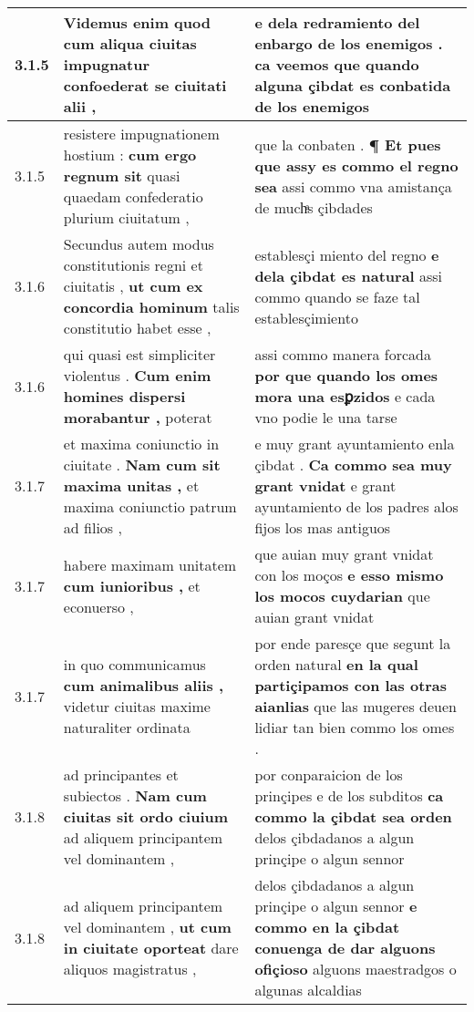 \begin{tabular}{|p{1cm}|p{6.5cm}|p{6.5cm}|}
3.1.5 & Videmus enim quod \textbf{ cum aliqua ciuitas impugnatur } confoederat se ciuitati alii , & e dela redramiento del enbargo de los enemigos . \textbf{ ca veemos que quando alguna çibdat es conbatida de los } enemigos \\\hline
3.1.5 & resistere impugnationem hostium : \textbf{ cum ergo regnum sit } quasi quaedam confederatio plurium ciuitatum , & que la conbaten . \textbf{ ¶ Et pues que assy es commo el regno sea } assi commo vna amistança de muchͣs çibdades \\\hline
3.1.6 & Secundus autem modus constitutionis regni et ciuitatis , \textbf{ ut cum ex concordia hominum } talis constitutio habet esse , & establesçi miento del regno \textbf{ e dela çibdat es natural } assi commo quando se faze tal establesçimiento \\\hline
3.1.6 & qui quasi est simpliciter violentus . \textbf{ Cum enim homines dispersi morabantur , } poterat & assi commo manera forcada \textbf{ por que quando los omes mora una esꝑzidos } e cada vno podie le una tarse \\\hline
3.1.7 & et maxima coniunctio in ciuitate . \textbf{ Nam cum sit maxima unitas , } et maxima coniunctio patrum ad filios , & e muy grant ayuntamiento enla çibdat . \textbf{ Ca commo sea muy grant vnidat } e grant ayuntamiento de los padres alos fijos los mas antiguos \\\hline
3.1.7 & habere maximam unitatem \textbf{ cum iunioribus , } et econuerso , & que auian muy grant vnidat con los moços \textbf{ e esso mismo los mocos cuydarian } que auian grant vnidat \\\hline
3.1.7 & in quo communicamus \textbf{ cum animalibus aliis , } videtur ciuitas maxime naturaliter ordinata & por ende paresçe que segunt la orden natural \textbf{ en la qual partiçipamos con las otras aianlias } que las mugeres deuen lidiar tan bien commo los omes . \\\hline
3.1.8 & ad principantes et subiectos . \textbf{ Nam cum ciuitas sit ordo ciuium } ad aliquem principantem vel dominantem , & por conparaicion de los prinçipes e de los subditos \textbf{ ca commo la çibdat sea orden } delos çibdadanos a algun prinçipe o algun sennor \\\hline
3.1.8 & ad aliquem principantem vel dominantem , \textbf{ ut cum in ciuitate oporteat } dare aliquos magistratus , & delos çibdadanos a algun prinçipe o algun sennor \textbf{ e commo en la çibdat conuenga de dar alguons ofiçioso } alguons maestradgos o algunas alcaldias \\\hline

\end{tabular}
